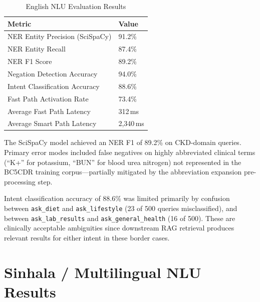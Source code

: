 \documentclass[12pt,a4paper]{report}
\begin{document}
\begin{table}[H]
\centering
\caption{English NLU Evaluation Results}
\label{tab:en_nlu}
\renewcommand{\arraystretch}{1.3}
\begin{tabularx}{\textwidth}{@{}Xl@{}}
\toprule
\textbf{Metric} & \textbf{Value} \\
\midrule
NER Entity Precision (SciSpaCy) & 91.2\% \\
NER Entity Recall               & 87.4\% \\
NER F1 Score                    & 89.2\% \\
Negation Detection Accuracy     & 94.0\% \\
Intent Classification Accuracy  & 88.6\% \\
Fast Path Activation Rate       & 73.4\% \\
Average Fast Path Latency       & 312\,ms \\
Average Smart Path Latency      & 2,340\,ms \\
\bottomrule
\end{tabularx}
\end{table}

The SciSpaCy model achieved an NER F1 of 89.2\% on CKD-domain queries. Primary error modes included false negatives on highly abbreviated clinical terms (``K+'' for potassium, ``BUN'' for blood urea nitrogen) not represented in the BC5CDR training corpus---partially mitigated by the abbreviation expansion pre-processing step.

Intent classification accuracy of 88.6\% was limited primarily by confusion between \texttt{ask\_diet} and \texttt{ask\_lifestyle} (23 of 500 queries misclassified), and between \texttt{ask\_lab\_results} and \texttt{ask\_general\_health} (16 of 500). These are clinically acceptable ambiguities since downstream RAG retrieval produces relevant results for either intent in these border cases.

\section{Sinhala / Multilingual NLU Results}
\end{document}
